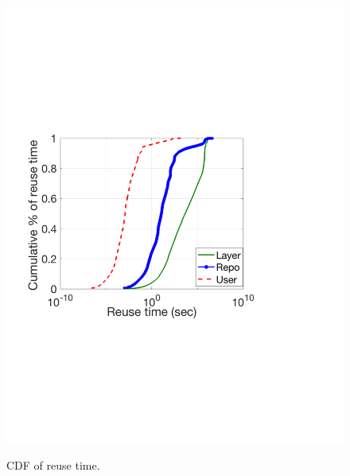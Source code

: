 \begin{figure}[t]
\begin{minipage}{0.225\textwidth}
		\includegraphics[width=1\textwidth]{graphs/reuse_time.pdf}
		\caption{CDF of reuse time.}
		\vspace{-3pt}
		\label{fig:reusetime}
	\end{minipage}
\end{figure}